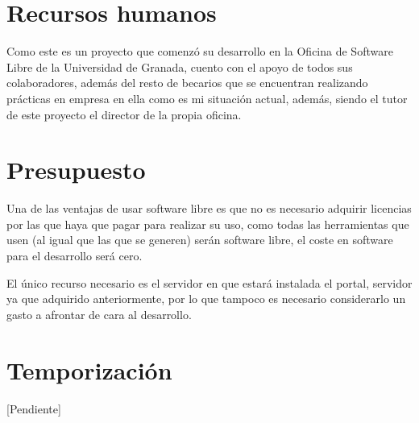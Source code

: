 \section{Recursos humanos}

Como este es un proyecto que comenzó su desarrollo en la Oficina de Software Libre de la Universidad de Granada, cuento con el
apoyo de todos sus colaboradores, además del resto de becarios que se encuentran realizando prácticas en empresa en ella
como es mi situación actual, además, siendo el tutor de este proyecto el director de la propia oficina.

\section{Presupuesto}

Una de las ventajas de usar software libre es que no es necesario adquirir licencias por las que haya que pagar para realizar 
su uso, como todas las herramientas que usen (al igual que las que se generen) serán software libre, el coste en software para 
el desarrollo será cero.

\bigskip

El único recurso necesario es el servidor en que estará instalada el portal, servidor ya que adquirido anteriormente, por
lo que tampoco es necesario considerarlo un gasto a afrontar de cara al desarrollo.

\section{Temporización}

[Pendiente]
